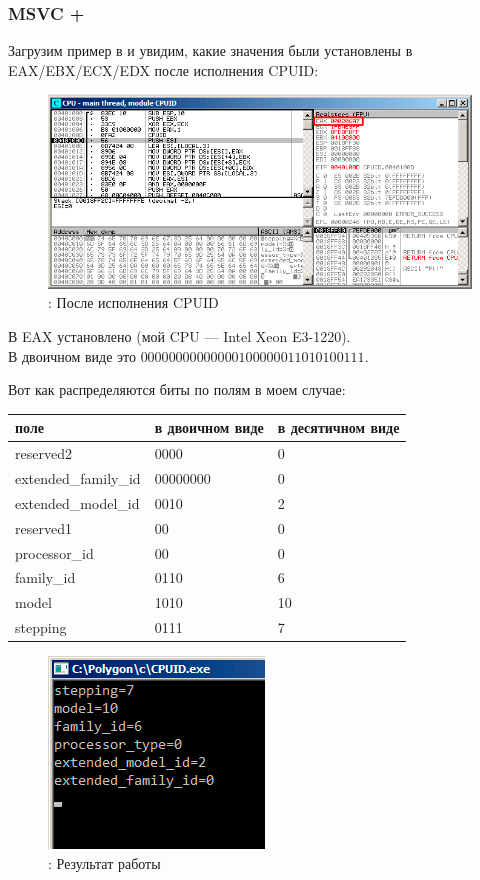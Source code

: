 ﻿\clearpage
\subsubsection{MSVC + \olly}
\myindex{\olly}

Загрузим пример в \olly и увидим, какие значения были установлены в EAX/EBX/ECX/EDX после исполнения CPUID: 

\begin{figure}[H]
\centering
\includegraphics[scale=\FigScale]{patterns/15_structs/6_bitfields/cpuid/olly.png}
\caption{\olly: После исполнения CPUID}
\label{fig:cpuid_olly_1}
\end{figure}

В EAX установлено  (мой \ac{CPU} --- Intel Xeon E3-1220).\\
В двоичном виде это $0000 0000 0000 0010 0000 0110 1010 0111$.

Вот как распределяются биты по полям в моем случае:

\begin{center}
\begin{tabular}{ | l | l | l | }
\hline
\headercolor{} поле &
\headercolor{} в двоичном виде &
\headercolor{} в десятичном виде \\
\hline
reserved2		& 0000 & 0 \\
\hline
extended\_family\_id	& 00000000 & 0 \\
\hline
extended\_model\_id	& 0010 & 2 \\
\hline
reserved1		& 00 & 0 \\
\hline
processor\_id		& 00 & 0 \\
\hline
family\_id		& 0110 & 6 \\
\hline
model			& 1010 & 10 \\
\hline
stepping		& 0111 & 7 \\
\hline
\end{tabular}
\end{center}

\begin{figure}[H]
\centering
\includegraphics[scale=\NormalScale]{patterns/15_structs/6_bitfields/cpuid/result.png}
\caption{\olly: Результат работы}
\label{fig:cpuid_olly_2}
\end{figure}
